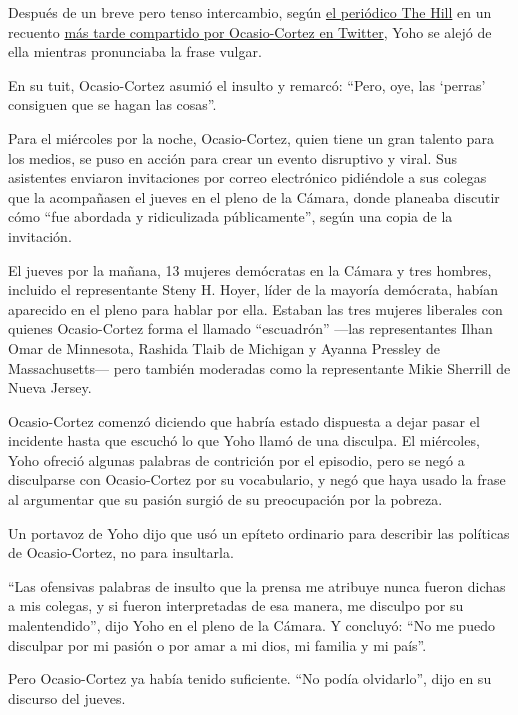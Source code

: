 Después de un breve pero tenso intercambio, según
\href{https://thehill.com/homenews/house/508259-ocaasio-cortez-accosted-by-gop-lawmaker-over-remarks-that-kind-of}{el
periódico The Hill} en un recuento
\href{https://twitter.com/AOC/status/1285574615910227968?s=20}{más tarde
compartido por Ocasio-Cortez en Twitter}, Yoho se alejó de ella mientras
pronunciaba la frase vulgar.

En su tuit, Ocasio-Cortez asumió el insulto y remarcó: ``Pero, oye, las
`perras' consiguen que se hagan las cosas''.

Para el miércoles por la noche, Ocasio-Cortez, quien tiene un gran
talento para los medios, se puso en acción para crear un evento
disruptivo y viral. Sus asistentes enviaron invitaciones por correo
electrónico pidiéndole a sus colegas que la acompañasen el jueves en el
pleno de la Cámara, donde planeaba discutir cómo ``fue abordada y
ridiculizada públicamente'', según una copia de la invitación.

El jueves por la mañana, 13 mujeres demócratas en la Cámara y tres
hombres, incluido el representante Steny H. Hoyer, líder de la mayoría
demócrata, habían aparecido en el pleno para hablar por ella. Estaban
las tres mujeres liberales con quienes Ocasio-Cortez forma el llamado
``escuadrón'' ---las representantes Ilhan Omar de Minnesota, Rashida
Tlaib de Michigan y Ayanna Pressley de Massachusetts--- pero también
moderadas como la representante Mikie Sherrill de Nueva Jersey.

Ocasio-Cortez comenzó diciendo que habría estado dispuesta a dejar pasar
el incidente hasta que escuchó lo que Yoho llamó de una disculpa. El
miércoles, Yoho ofreció algunas palabras de contrición por el episodio,
pero se negó a disculparse con Ocasio-Cortez por su vocabulario, y negó
que haya usado la frase al argumentar que su pasión surgió de su
preocupación por la pobreza.

Un portavoz de Yoho dijo que usó un epíteto ordinario para describir las
políticas de Ocasio-Cortez, no para insultarla.

``Las ofensivas palabras de insulto que la prensa me atribuye nunca
fueron dichas a mis colegas, y si fueron interpretadas de esa manera, me
disculpo por su malentendido'', dijo Yoho en el pleno de la Cámara. Y
concluyó: ``No me puedo disculpar por mi pasión o por amar a mi dios, mi
familia y mi país''.

Pero Ocasio-Cortez ya había tenido suficiente. ``No podía olvidarlo'',
dijo en su discurso del jueves.

